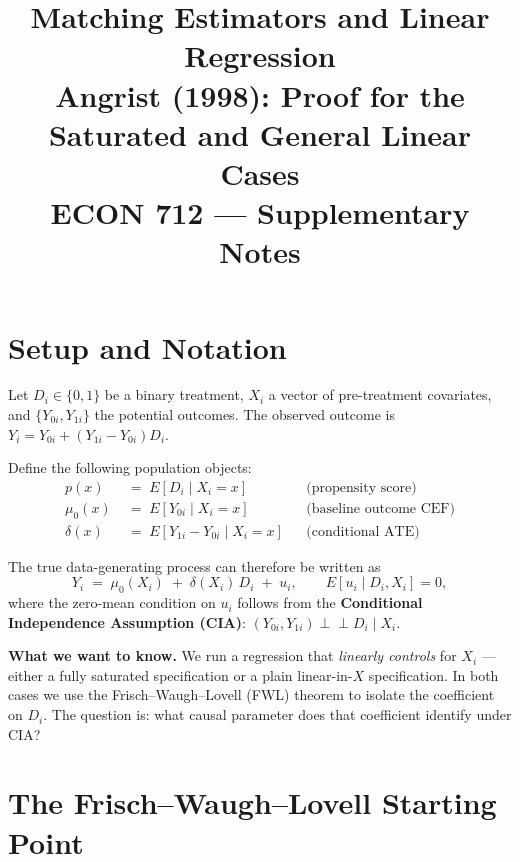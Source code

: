 \documentclass[11pt]{article}
\title{%
  \textbf{Matching Estimators and Linear Regression}\\[6pt]
  \large Angrist (1998): Proof for the Saturated and General Linear Cases\\[4pt]
  \normalsize ECON 712 --- Supplementary Notes
}
\author{}
\date{}
\theoremstyle{remark}
\begin{document}
\maketitle
\tableofcontents
\bigskip

\section{Setup and Notation}

Let $D_i \in \{0,1\}$ be a binary treatment, $X_i$ a vector of pre-treatment covariates,
and $\{Y_{0i}, Y_{1i}\}$ the potential outcomes.  The observed outcome is
$Y_i = Y_{0i} + (Y_{1i} - Y_{0i})D_i$.

Define the following population objects:
\begin{align*}
  p(x)      &\;=\; E[D_i \mid X_i = x]               &&\text{(propensity score)}\\
  \mu_0(x)  &\;=\; E[Y_{0i} \mid X_i = x]             &&\text{(baseline outcome CEF)}\\
  \delta(x) &\;=\; E[Y_{1i} - Y_{0i} \mid X_i = x]   &&\text{(conditional ATE)}
\end{align*}

The true data-generating process can therefore be written as
\begin{equation}\label{eq:dgp}
  Y_i \;=\; \mu_0(X_i) \;+\; \delta(X_i)\,D_i \;+\; u_i,
  \qquad E[u_i \mid D_i, X_i] = 0,
\end{equation}
where the zero-mean condition on $u_i$ follows from the \textbf{Conditional Independence
Assumption (CIA)}: $(Y_{0i},Y_{1i}) \perp\!\!\!\perp D_i \mid X_i$.

\bigskip

\textbf{What we want to know.}  We run a regression that \emph{linearly controls} for
$X_i$ --- either a fully saturated specification or a plain linear-in-$X$ specification.
In both cases we use the Frisch--Waugh--Lovell (FWL) theorem to isolate the coefficient
on $D_i$.  The question is: what causal parameter does that coefficient identify under CIA?

\section{The Frisch--Waugh--Lovell Starting Point}
\end{document}
